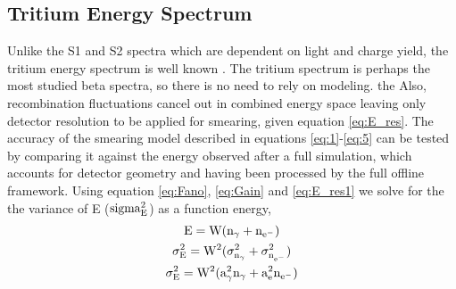 





\subsection{Tritium Energy Spectrum}

Unlike the S1 and S2 spectra which are dependent on light and charge yield, the tritium energy spectrum is well known \cite{Tritium_Eq}. The tritium spectrum is perhaps the most studied beta spectra, so there is no need to rely on modeling. the  Also, recombination fluctuations cancel out in combined energy space leaving only detector resolution to be applied for smearing, given equation \ref{eq:E_res}. The accuracy of the smearing model described in equations \ref{eq:1}-\ref{eq:5} can be tested by comparing it against the energy observed after a full simulation, which accounts for detector geometry and having been processed by the full offline framework. Using equation \ref{eq:Fano}, \ref{eq:Gain} and \ref{eq:E_res1} we solve for the the variance of E ($\rm sigma_{E}^2$) as a function energy,
\begin{gather}
\label{eq:E_res1} \rm E= W(n_\gamma + n_{e^-}) \\
 \rm \sigma_{E}^2= W^2(\sigma_{n_\gamma}^2 + \sigma_{n_{e^-}}^2) \\ 
 \rm \sigma_{E}^2= W^2(a_\gamma^2 n_\gamma + a_e^2 n_{e^-})
\label{eq:E_res}
\end{gather}

